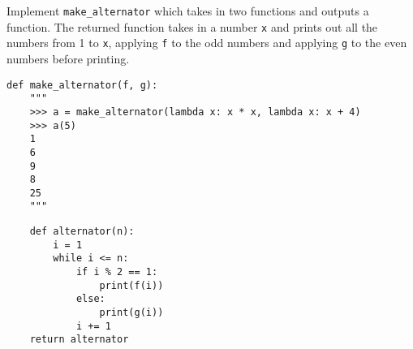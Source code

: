 \begin{blocksection}
\question Implement \lstinline$make_alternator$ which takes in two functions and outputs a function. The returned function takes in a number \texttt{x} and prints out all the numbers from 1 to \texttt{x}, applying \texttt{f} to the odd numbers and applying \texttt{g} to the even numbers before printing.

\begin{lstlisting}
def make_alternator(f, g):
    """
    >>> a = make_alternator(lambda x: x * x, lambda x: x + 4)
    >>> a(5)
    1
    6
    9
    8
    25
    """
\end{lstlisting}

\begin{solution}[1.5in]
\begin{lstlisting}
    def alternator(n):
        i = 1
        while i <= n:
            if i % 2 == 1:
                print(f(i))
            else:
                print(g(i))
            i += 1
    return alternator
\end{lstlisting}
\end{solution}
\end{blocksection}
